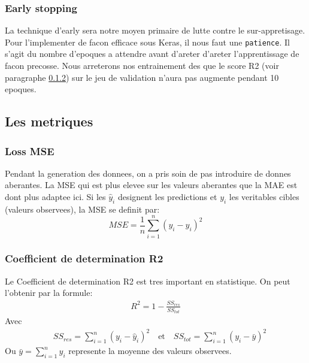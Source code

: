 % 
% 

\subsubsection{Early stopping}
La technique d'early sera notre moyen primaire de lutte contre le sur-appretisage. Pour l'implementer de facon efficace sous Keras, il nous faut une \verb|patience|. Il s'agit du nombre d'epoques a attendre avant d'areter d'areter l'apprentissage de facon precosse. Nous arreterons nos entrainement des que le score R2 (voir paragraphe \ref{subsub:R2}) sur le jeu de validation n'aura pas augmente pendant 10 epoques. 

\subsection{Les metriques}

\subsubsection{Loss MSE}
Pendant la generation des donnees, on a pris soin de pas introduire de donnes aberantes. La MSE qui est plus elevee sur les valeurs aberantes que la MAE est dont plus adaptee ici. Si les $\hat{y}_i$ designent les predictions et $y_i$ les veritables cibles (valeurs observees), la MSE se definit par:
\begin{equation}
 MSE = \frac{1}{n} \sum_{i=1}^{n} \left( y_i - \hat{y}_i \right)^2
 \label{eqn:MSE}
\end{equation}

\subsubsection{Coefficient de determination R2}
\label{subsub:R2}
Le Coefficient de determination R2 est tres important en statistique. On peut l'obtenir par la formule:
\begin{align}
 R^2 = 1 - \frac{SS_{res}}{SS_{tot}}
 \label{eqn:R2}
\end{align}
Avec
\begin{align*}
 \quad SS_{res} =  \sum_{i=1}^{n} \left( y_i - \hat{y}_i \right)^2 \quad \text{et} \quad SS_{tot} =  \sum_{i=1}^{n} \left( y_i - \bar{y} \right)^2 
\end{align*}
Ou $ \bar{y} = \sum_{i=1}^{n} y_i $ represente la moyenne des valeurs observees.

